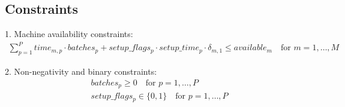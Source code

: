 \documentclass{article}
\begin{document}
\subsection*{Constraints}
1. Machine availability constraints:
\begin{align*}
    \sum_{p=1}^{P} time_{m,p} \cdot batches_{p} + setup\_flags_{p} \cdot setup\_time_{p} \cdot \delta_{m,1} \leq available_{m} \quad \text{for } m = 1, \ldots, M
\end{align*}

2. Non-negativity and binary constraints:
\begin{align*}
    &batches_{p} \geq 0 \quad \text{for } p = 1, \ldots, P \\
    &setup\_flags_{p} \in \{0, 1\} \quad \text{for } p = 1, \ldots, P
\end{align*}
\end{document}
